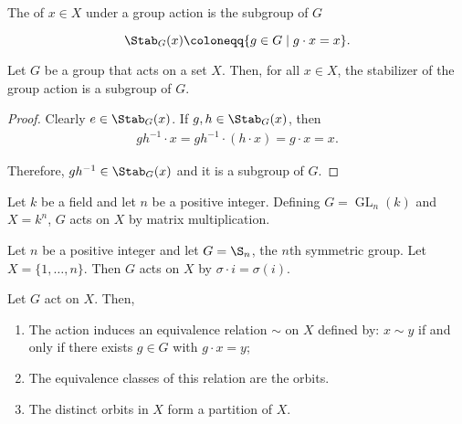 \documentclass[12pt]{report}
\newcommand{\GL}{\operatorname{GL}}
\begin{document}
\begin{definition}\label{def:group-theory:stabilizer}
  The  of \(x \in X\) under a group action is the subgroup of \(G\)

  \[\Stab_{G}(x) \coloneqq \{ g \in G \mid g \cdot x = x \}.\]
\end{definition}

\begin{lemma}\label{lem:group-theory:stabilizer-is-subgroup}
  Let \(G\) be a group that acts on a set \(X\). Then, for all \(x \in X\), the stabilizer of the group action is a subgroup of \(G\).
\end{lemma}

\begin{proof}
  Clearly \(e \in \Stab_{G}(x)\). If \(g, h \in \Stab_{G}(x)\), then
  \begin{align*}
    gh^{-1} \cdot x = gh^{-1} \cdot (h \cdot x) = g \cdot x = x.
  \end{align*}

  Therefore, \(gh^{-1} \in \Stab_{G}(x)\) and it is a subgroup of \(G\).
\end{proof}

\begin{example}
  Let \(k\) be a field and let \(n\) be a positive integer. Defining \(G = \GL_{n}(k)\) and \(X = k^{n}\), \(G\) acts on \(X\) by matrix multiplication.
\end{example}

\begin{example}
  Let \(n\) be a positive integer and let \(G = \S_{n}\), the \(n\)th symmetric group. Let \(X = \{1, \ldots, n\}\). Then \(G\) acts on \(X\) by \(\sigma \cdot i = \sigma(i)\).
\end{example}


\begin{lemma}\label{lem:group-theory:orbits-partition}
  Let \(G\) act on \(X\). Then,
  \begin{enumerate}
    \item The action induces an equivalence relation \(\sim\) on \(X\) defined by: \(x \sim y\) if and only if there exists \(g \in G\) with \(g \cdot x = y\);
    \item The equivalence classes of this relation are the orbits.
    \item The distinct orbits in \(X\) form a partition of \(X\).
  \end{enumerate}
\end{lemma}
\end{document}
